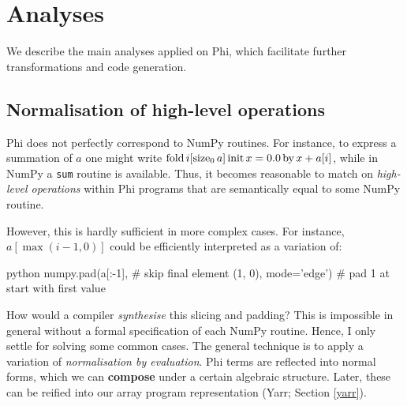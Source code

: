 

\needspace{15em}
\section{Analyses}
\label{compiler-analyses}

We describe the main analyses applied on Phi, which facilitate further transformations and code generation. 

\subsection{Normalisation of high-level operations}

Phi does not perfectly correspond to NumPy routines. For instance, to express a summation of $a$ one might write $\phifold{i}{\phisize{a}{0}}{x}{0.0}{x + a[i]}$, while in NumPy a \texttt{sum} routine is available. Thus, it becomes reasonable to match on \textit{high-level operations} within Phi programs that are semantically equal to some NumPy routine.

However, this is hardly sufficient in more complex cases. For instance, $a[\max(i - 1, 0)]$ could be efficiently interpreted as a variation of:
\begin{center}
\begin{cminted}{python}
numpy.pad(a[:-1],               # skip final element
          (1, 0), mode='edge')  # pad 1 at start with first value
\end{cminted}
\end{center}
How would a compiler \textit{synthesise} this slicing and padding? 
This is impossible in general without a formal specification of each NumPy routine. Hence, I only settle for solving some common cases.
The general technique is to apply a variation of \textit{normalisation by evaluation}. Phi terms are reflected into normal forms, which we can \textbf{compose} under a certain algebraic structure. Later, these can be reified into our array program representation (Yarr; Section \ref{yarr}).

